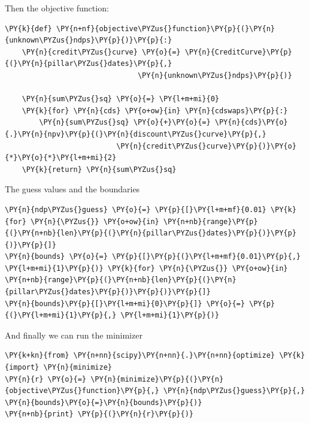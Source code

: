 {Then the objective function:
\begin{tcolorbox}[breakable, size=fbox, boxrule=1pt, pad at break*=1mm,colback=cellbackground, colframe=cellborder]
\begin{Verbatim}[commandchars=\\\{\}]
\PY{k}{def} \PY{n+nf}{objective\PYZus{}function}\PY{p}{(}\PY{n}{unknown\PYZus{}ndps}\PY{p}{)}\PY{p}{:}
    \PY{n}{credit\PYZus{}curve} \PY{o}{=} \PY{n}{CreditCurve}\PY{p}{(}\PY{n}{pillar\PYZus{}dates}\PY{p}{,} 
                               \PY{n}{unknown\PYZus{}ndps}\PY{p}{)}
	
    \PY{n}{sum\PYZus{}sq} \PY{o}{=} \PY{l+m+mi}{0}
    \PY{k}{for} \PY{n}{cds} \PY{o+ow}{in} \PY{n}{cdswaps}\PY{p}{:}
        \PY{n}{sum\PYZus{}sq} \PY{o}{+}\PY{o}{=} \PY{n}{cds}\PY{o}{.}\PY{n}{npv}\PY{p}{(}\PY{n}{discount\PYZus{}curve}\PY{p}{,} 
                          \PY{n}{credit\PYZus{}curve}\PY{p}{)}\PY{o}{*}\PY{o}{*}\PY{l+m+mi}{2}
    \PY{k}{return} \PY{n}{sum\PYZus{}sq}
\end{Verbatim}
\end{tcolorbox}

The guess values and the boundaries
\begin{tcolorbox}[breakable, size=fbox, boxrule=1pt, pad at break*=1mm,colback=cellbackground, colframe=cellborder]
\begin{Verbatim}[commandchars=\\\{\}]
\PY{n}{ndp\PYZus{}guess} \PY{o}{=} \PY{p}{[}\PY{l+m+mf}{0.01} \PY{k}{for} \PY{n}{\PYZus{}} \PY{o+ow}{in} \PY{n+nb}{range}\PY{p}{(}\PY{n+nb}{len}\PY{p}{(}\PY{n}{pillar\PYZus{}dates}\PY{p}{)}\PY{p}{)}\PY{p}{]}
\PY{n}{bounds} \PY{o}{=} \PY{p}{[}\PY{p}{(}\PY{l+m+mf}{0.01}\PY{p}{,} \PY{l+m+mi}{1}\PY{p}{)} \PY{k}{for} \PY{n}{\PYZus{}} \PY{o+ow}{in} \PY{n+nb}{range}\PY{p}{(}\PY{n+nb}{len}\PY{p}{(}\PY{n}{pillar\PYZus{}dates}\PY{p}{)}\PY{p}{)}\PY{p}{]}
\PY{n}{bounds}\PY{p}{[}\PY{l+m+mi}{0}\PY{p}{]} \PY{o}{=} \PY{p}{(}\PY{l+m+mi}{1}\PY{p}{,} \PY{l+m+mi}{1}\PY{p}{)}
\end{Verbatim}
\end{tcolorbox}

And finally we can run the minimizer
\begin{tcolorbox}[breakable, size=fbox, boxrule=1pt, pad at break*=1mm,colback=cellbackground, colframe=cellborder]
\begin{Verbatim}[commandchars=\\\{\}]
\PY{k+kn}{from} \PY{n+nn}{scipy}\PY{n+nn}{.}\PY{n+nn}{optimize} \PY{k}{import} \PY{n}{minimize}
\PY{n}{r} \PY{o}{=} \PY{n}{minimize}\PY{p}{(}\PY{n}{objective\PYZus{}function}\PY{p}{,} \PY{n}{ndp\PYZus{}guess}\PY{p}{,} \PY{n}{bounds}\PY{o}{=}\PY{n}{bounds}\PY{p}{)}
\PY{n+nb}{print} \PY{p}{(}\PY{n}{r}\PY{p}{)}


\end{Verbatim}
\end{tcolorbox}}
